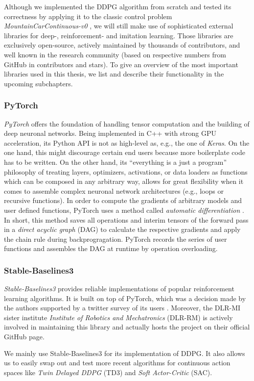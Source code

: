 Although we implemented the DDPG algorithm from scratch and tested its correctness by applying it to the classic control problem \textit{MountainCarContinuous-v0} \cite[]{moore1990efficient}, we will still make use of sophisticated external libraries for deep-, reinforcement- and imitation learning. Those libraries are exclusively open-source, actively maintained by thousands of contributors, and well known in the research community (based on respective numbers from GitHub in contributors and stars). To give an overview of the most important libraries used in this thesis, we list and describe their functionality in the upcoming subchapters.

\subsubsection{PyTorch}
\textit{PyTorch} \cite[]{NEURIPS2019_9015} offers the foundation of handling tensor computation and the building of deep neuronal networks. Being implemented in C++ with strong GPU acceleration, its Python API is not as high-level as, e.g., the one of \textit{Keras}. On the one hand, this might discourage certain end users because more boilerplate code has to be written. On the other hand, its  “everything is a just a program” philosophy \cite[p.~4]{NEURIPS2019_9015} of treating layers, optimizers, activations, or data loaders as functions which can be composed in any arbitrary way, allows for great flexibility when it comes to assemble complex neuronal network architectures (e.g., loops or recursive functions). In order to compute the gradients of arbitrary models and user defined functions, PyTorch uses a method called \textit{automatic differentiation} \cite[p.~5]{NEURIPS2019_9015}. In short, this method saves all operations and interim tensors of the forward pass in a \textit{direct acyclic graph} (DAG) to calculate the respective gradients and apply the chain rule during backprogragation. PyTorch records the series of user functions and assembles the DAG at runtime by operation overloading.

\subsubsection{Stable-Baselines3}
\textit{Stable-Baselines3} \cite[]{stable-baselines3} provides reliable implementations of popular reinforcement learning algorithms. It is built on top of PyTorch, which was a decision made by the authors supported by a twitter survey of its users \cite[]{pytorch-survey}. Moreover, the DLR-MI sister institute \textit{Institute of Robotics and Mechatronics} (DLR-RM) is actively involved in maintaining this library and actually hosts the project on their official GitHub page.
\par
We mainly use Stable-Baselines3 for its implementation of DDPG. It also allows us to easily swap out and test more recent algorithms for continuous action spaces like \textit{Twin Delayed DDPG} (TD3) and \textit{Soft Actor-Critic} (SAC). 

